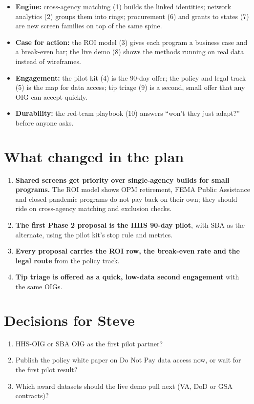 \documentclass[letterpaper,11pt]{article}
\providecommand{\tightlist}{\setlength{\itemsep}{0pt}\setlength{\parskip}{0pt}}
\begin{document}
\begin{itemize}
\tightlist
\item
  \textbf{Engine:} cross-agency matching (1) builds the linked
  identities; network analytics (2) groups them into rings; procurement
  (6) and grants to states (7) are new screen families on top of the
  same spine.
\item
  \textbf{Case for action:} the ROI model (3) gives each program a
  business case and a break-even bar; the live demo (8) shows the
  methods running on real data instead of wireframes.
\item
  \textbf{Engagement:} the pilot kit (4) is the 90-day offer; the policy
  and legal track (5) is the map for data access; tip triage (9) is a
  second, small offer that any OIG can accept quickly.
\item
  \textbf{Durability:} the red-team playbook (10) answers ``won't they
  just adapt?'' before anyone asks.
\end{itemize}

\hypertarget{what-changed-in-the-plan}{%
\section{What changed in the plan}\label{what-changed-in-the-plan}}

\begin{enumerate}
\def\labelenumi{\arabic{enumi}.}
\tightlist
\item
  \textbf{Shared screens get priority over single-agency builds for
  small programs.} The ROI model shows OPM retirement, FEMA Public
  Assistance and closed pandemic programs do not pay back on their own;
  they should ride on cross-agency matching and exclusion checks.
\item
  \textbf{The first Phase 2 proposal is the HHS 90-day pilot}, with SBA
  as the alternate, using the pilot kit's stop rule and metrics.
\item
  \textbf{Every proposal carries the ROI row, the break-even rate and
  the legal route} from the policy track.
\item
  \textbf{Tip triage is offered as a quick, low-data second engagement}
  with the same OIGs.
\end{enumerate}

\hypertarget{decisions-for-steve}{%
\section{Decisions for Steve}\label{decisions-for-steve}}

\begin{enumerate}
\def\labelenumi{\arabic{enumi}.}
\tightlist
\item
  HHS-OIG or SBA OIG as the first pilot partner?
\item
  Publish the policy white paper on Do Not Pay data access now, or wait
  for the first pilot result?
\item
  Which award datasets should the live demo pull next (VA, DoD or GSA
  contracts)?
\end{enumerate}
\end{document}
